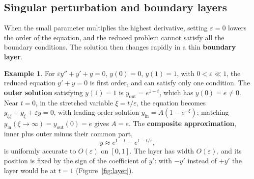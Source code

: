 \documentclass[11pt,a4paper]{article}
\numberwithin{equation}{section}
\theoremstyle{definition}
\newtheorem{exa}[thm]{Example}
\begin{document}
\subsection{Singular perturbation and boundary layers}
\label{ssec:singular}

When the small parameter multiplies the highest derivative, setting $\varepsilon = 0$ lowers the order of the equation, and the reduced problem cannot satisfy all the boundary conditions. The
solution then changes rapidly in a thin \textbf{boundary layer}.

\begin{exa}
\label{ex:boundarylayer}
For $\varepsilon y'' + y' + y = 0$, $y(0) = 0$, $y(1) = 1$, with $0 < \varepsilon \ll 1$, the reduced equation $y' + y = 0$ is first order, and can satisfy only one condition. The \textbf{outer solution} satisfying
$y(1) = 1$ is $y_{\text{out}} = e^{1-t}$, which has $y(0) = e \neq 0$. Near $t = 0$, in the stretched variable $\xi = t/\varepsilon$, the equation becomes $y_{\xi\xi} + y_\xi + \varepsilon y = 0$, with leading-order solution
$y_{\text{in}} = A(1 - e^{-\xi})$; matching $y_{\text{in}}(\xi \to \infty) = y_{\text{out}}(0) = e$ gives $A = e$. The \textbf{composite approximation}, inner plus outer minus their common part,
\[
y \approx e^{1-t} - e^{1 - t/\varepsilon} ,
\]
is uniformly accurate to $O(\varepsilon)$ on $[0, 1]$. The layer has width $O(\varepsilon)$, and its position is fixed by the sign of the coefficient of $y'$: with $-y'$ instead of $+y'$ the layer would be at $t = 1$
(Figure~\ref{fig:layer}).
\end{exa}
\end{document}
